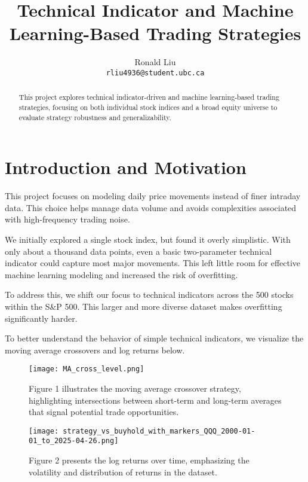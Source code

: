 \documentclass{article}
\title{Technical Indicator and Machine Learning-Based Trading Strategies}
\author{%
  Ronald Liu\\
  \texttt{rliu4936@student.ubc.ca}
}
\begin{document}
\maketitle


\begin{abstract}
    This project explores technical indicator-driven and machine learning-based trading strategies, focusing on both individual stock indices and a broad equity universe to evaluate strategy robustness and generalizability.
\end{abstract}


\section{Introduction and Motivation}

This project focuses on modeling daily price movements instead of finer intraday data. This choice helps manage data volume and avoids complexities associated with high-frequency trading noise.

We initially explored a single stock index, but found it overly simplistic. With only about a thousand data points, even a basic two-parameter technical indicator could capture most major movements. This left little room for effective machine learning modeling and increased the risk of overfitting.

To address this, we shift our focus to technical indicators across the 500 stocks within the S\&P 500. This larger and more diverse dataset makes overfitting significantly harder.

To better understand the behavior of simple technical indicators, we visualize the moving average crossovers and log returns below.

\begin{figure}[h]
    \centering
    \texttt{[image: MA\_cross\_level.png]}
    \caption{Figure 1 illustrates the moving average crossover strategy, highlighting intersections between short-term and long-term averages that signal potential trade opportunities.}
    \label{fig:ma_cross_level}
\end{figure}

\begin{figure}[h]
    \centering
    \texttt{[image: strategy\_vs\_buyhold\_with\_markers\_QQQ\_2000-01-01\_to\_2025-04-26.png]}
    \caption{Figure 2 presents the log returns over time, emphasizing the volatility and distribution of returns in the dataset.}
    \label{fig:log_returns}
\end{figure}
\end{document}
